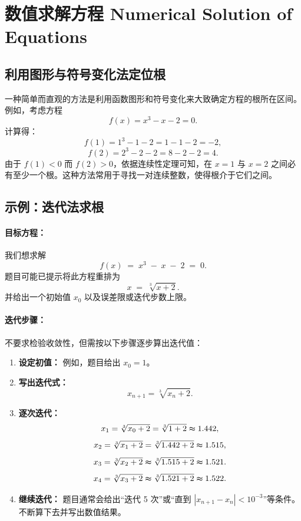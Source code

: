 \documentclass[8pt,a4paper,twoside]{tau-class/tau}
\begin{document}
\section{数值求解方程 Numerical Solution of Equations}

\subsection{利用图形与符号变化法定位根}
一种简单而直观的方法是利用函数图形和符号变化来大致确定方程的根所在区间。\\
例如，考虑方程
\[
f(x)=x^3 − x − 2 = 0.
\]
计算得：
\[
f(1)=1^3 − 1 − 2 = 1 − 1 − 2 = −2,
\]
\[
f(2)=2^3 − 2 − 2 = 8 − 2 − 2 = 4.
\]
由于 \(f(1) < 0\) 而 \(f(2) > 0\)，依据连续性定理可知，在 \(x=1\) 与 \(x=2\) 之间必有至少一个根。这种方法常用于寻找一对连续整数，使得根介于它们之间。
\subsection{示例：迭代法求根}

\paragraph{目标方程：}
我们想求解
\[
f(x) \;=\; x^3 \;−\; x \;−\; 2 \;=\; 0.
\]
题目可能已提示将此方程重排为
\[
x \;=\; \sqrt[3]{x + 2}.
\]
并给出一个初始值 \(x_0\) 以及误差限或迭代步数上限。

\paragraph{迭代步骤：}
不要求检验收敛性，但需按以下步骤逐步算出迭代值：
\begin{enumerate}
  \item \textbf{设定初值：} 例如，题目给出 \(x_0 = 1\)。
  \item \textbf{写出迭代式：}
    \[
      x_{n+1} = \sqrt[3]{x_n + 2}.
    \]
  \item \textbf{逐次迭代：} 
    \[
      x_1 = \sqrt[3]{x_0 + 2} = \sqrt[3]{1 + 2}\thickapprox 1.442,
    \]
    \[
      x_2 = \sqrt[3]{x_1 + 2} = \sqrt[3]{1.442 + 2}\thickapprox 1.515,
    \]
    \[
      x_3 = \sqrt[3]{x_2 + 2} \thickapprox \sqrt[3]{1.515 + 2}\thickapprox 1.521.
    \]
    \[
      x_4 = \sqrt[3]{x_3 + 2} \thickapprox \sqrt[3]{1.521 + 2}\thickapprox 1.522.
    \]
  \item \textbf{继续迭代：} 题目通常会给出“迭代 5 次”或“直到 \(|x_{n+1}−x_n|<10^{−3}\)”等条件。不断算下去并写出数值结果。
\end{enumerate}
\end{document}
